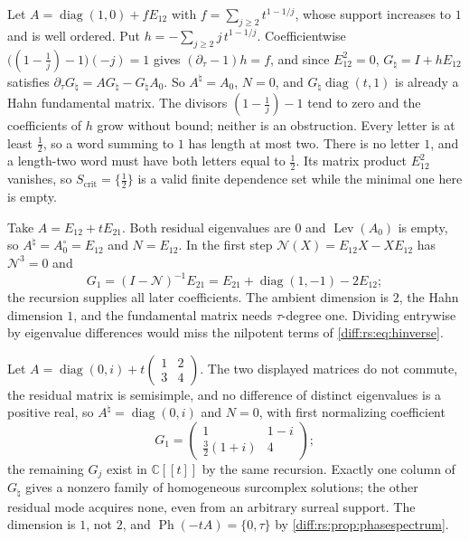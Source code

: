 \documentclass[11pt,letterpaper]{article}
\numberwithin{equation}{section}
\theoremstyle{definition}
\theoremstyle{remark}
\newcommand{\C}{\mathbb C}
\newcommand{\der}{\partial}
\newcommand{\Ph}{\operatorname{Ph}}
\newcommand{\derT}{\der_{\tau}}
\newcommand{\Lev}{\operatorname{Lev}}
\newcommand{\crit}{\mathrm{crit}}
\begin{document}
\begin{example}
\label{diff:rs:ex:accumulation}
Let $A=\operatorname{diag}(1,0)+fE_{12}$ with $f=\sum_{j\geq2}t^{1-1/j}$, whose
support increases to $1$ and is well ordered. Put
$h=-\sum_{j\geq2}j\,t^{1-1/j}$. Coefficientwise
$\bigl((1-\tfrac1j)-1\bigr)(-j)=1$ gives $(\derT-1)h=f$, and since $E_{12}^{2}=0$,
$G_{\natural}=I+hE_{12}$ satisfies $\derT G_{\natural}=AG_{\natural}-G_{\natural}A_{0}$.
So $A^{\natural}=A_{0}$, $N=0$, and $G_{\natural}\operatorname{diag}(t,1)$ is
already a Hahn fundamental matrix. The divisors $(1-\frac1j)-1$ tend to zero and
the coefficients of $h$ grow without bound; neither is an obstruction. Every letter is at least $\tfrac12$, so a word summing to $1$ has
length at most two. There is no letter $1$, and a length-two word must
have both letters equal to $\tfrac12$. Its matrix product $E_{12}^{2}$
vanishes, so $S_{\crit}=\{\tfrac12\}$ is a valid finite dependence set
while the minimal one here is empty.
\end{example}

\begin{example}
\label{diff:rs:ex:nonsemisimple}
Take $A=E_{12}+tE_{21}$. Both residual eigenvalues are $0$ and $\Lev(A_{0})$ is
empty, so $A^{\natural}=A_{0}^{\circ}=E_{12}$ and $N=E_{12}$. In the first step
$\mathcal N(X)=E_{12}X-XE_{12}$ has $\mathcal N^{3}=0$ and
\[
 G_{1}=(I-\mathcal N)^{-1}E_{21}=E_{21}+\operatorname{diag}(1,-1)-2E_{12};
\]
the recursion supplies all later coefficients. The ambient dimension is $2$,
the Hahn dimension $1$, and the fundamental matrix needs $\tau$-degree one.
Dividing entrywise by eigenvalue differences would miss the nilpotent terms of
\cref{diff:rs:eq:hinverse}.
\end{example}

\begin{example}
\label{diff:rs:ex:mixed}
Let $A=\operatorname{diag}(0,i)+t\left(\begin{smallmatrix}1&2\\3&4\end{smallmatrix}\right)$.
The two displayed matrices do not commute, the residual matrix is semisimple,
and no difference of distinct eigenvalues is a positive real, so
$A^{\natural}=\operatorname{diag}(0,i)$ and $N=0$, with first normalizing
coefficient
\[
 G_{1}=\begin{pmatrix}1&1-i\\ \tfrac32(1+i)&4\end{pmatrix};
\]
the remaining $G_{j}$ exist in $\C[[t]]$ by the same recursion. Exactly one
column of $G_{\natural}$ gives a nonzero family of homogeneous surcomplex
solutions; the other residual mode acquires none, even from an arbitrary
surreal support. The dimension is $1$, not $2$, and
$\Ph(-tA)=\{0,\tau\}$ by \cref{diff:rs:prop:phasespectrum}.
\end{example}
\end{document}
